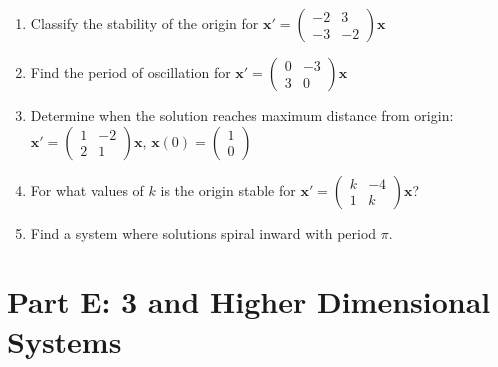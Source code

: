 \documentclass[12pt]{article}
\begin{document}
\begin{enumerate}[start=16]
\item Classify the stability of the origin for $\mathbf{x}' = \begin{pmatrix} -2 & 3 \\ -3 & -2 \end{pmatrix}\mathbf{x}$

\item Find the period of oscillation for $\mathbf{x}' = \begin{pmatrix} 0 & -3 \\ 3 & 0 \end{pmatrix}\mathbf{x}$

\item Determine when the solution reaches maximum distance from origin: $\mathbf{x}' = \begin{pmatrix} 1 & -2 \\ 2 & 1 \end{pmatrix}\mathbf{x}$, $\mathbf{x}(0) = \begin{pmatrix} 1 \\ 0 \end{pmatrix}$

\item For what values of $k$ is the origin stable for $\mathbf{x}' = \begin{pmatrix} k & -4 \\ 1 & k \end{pmatrix}\mathbf{x}$?

\item Find a system where solutions spiral inward with period $\pi$.
\end{enumerate}

\section*{Part E: 3 and Higher Dimensional Systems}
\end{document}
